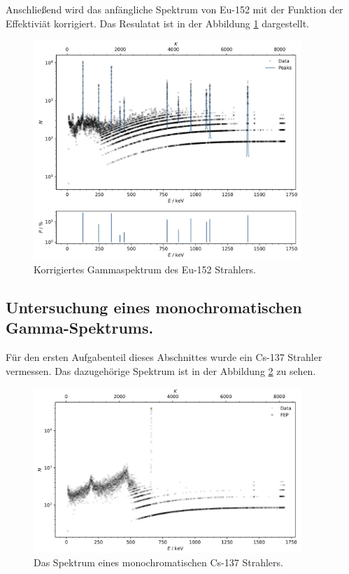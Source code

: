 Anschließend wird das anfängliche Spektrum von Eu-152 mit der Funktion der Effektiviät korrigiert.
Das Resulatat ist in der Abbildung \ref{fig:plot6} dargestellt.

\begin{figure}[H]
    \centering
    \includegraphics[width=0.9\textwidth]{content/plots/plot6.jpg}
   \caption{Korrigiertes Gammaspektrum des Eu-152 Strahlers.}
    \label{fig:plot6}
\end{figure}

\subsection{Untersuchung eines monochromatischen Gamma-Spektrums.}
\label{sec:untersuchung gamma spektrum}

Für den ersten Aufgabenteil dieses Abschnittes wurde ein Cs-137 Strahler vermessen.
Das dazugehörige Spektrum ist in der Abbildung \ref{fig:plot7} zu sehen.

\begin{figure}[H]
    \centering
    \includegraphics[width=0.9\textwidth]{content/plots/plot7.jpg}
    \caption{Das Spektrum eines monochromatischen Cs-137 Strahlers.}
    \label{fig:plot7}
\end{figure}

